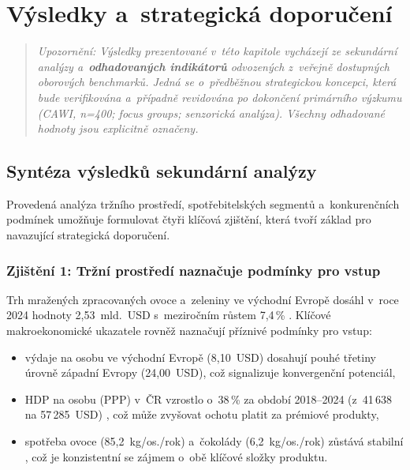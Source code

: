 \chapter{Výsledky a~strategická doporučení}
\label{chap:results}

\begin{quote}
\textit{Upozornění: Výsledky prezentované v~této kapitole vycházejí ze sekundární analýzy a~\textbf{odhadovaných indikátorů} odvozených z~veřejně dostupných oborových benchmarků. Jedná se o~předběžnou strategickou koncepci, která bude verifikována a~případně revidována po dokončení primárního výzkumu (CAWI, n=400; focus groups; senzorická analýza). Všechny odhadované hodnoty jsou explicitně označeny.}
\end{quote}

\section{Syntéza výsledků sekundární analýzy}
\label{sec:res_synthesis}

Provedená analýza tržního prostředí, spotřebitelských segmentů a~konkurenčních podmínek umožňuje formulovat čtyři klíčová zjištění, která tvoří základ pro navazující strategická doporučení.

\subsection{Zjištění 1: Tržní prostředí naznačuje podmínky pro vstup}

Trh mražených zpracovaných ovoce a~zeleniny ve východní Evropě dosáhl v~roce 2024 hodnoty 2,53~mld.~USD s~meziročním růstem 7,4\,\% \parencite{frozenfoodeurope_2025}. Klíčové makroekonomické ukazatele rovněž naznačují příznivé podmínky pro vstup:
\begin{itemize}
  \item výdaje na osobu ve východní Evropě (8,10~USD) dosahují pouhé třetiny úrovně západní Evropy (24,00~USD), což signalizuje konvergenční potenciál,
  \item HDP na osobu (PPP) v~ČR vzrostlo o~38\,\% za období 2018--2024 (z~41\,638 na 57\,285~USD) \parencite{worldbank_gdp_2026}, což může zvyšovat ochotu platit za prémiové produkty,
  \item spotřeba ovoce (85,2~kg/os./rok) a~čokolády (6,2~kg/os./rok) zůstává stabilní \parencite{czso_spotreba_2024}, což je konzistentní se zájmem o~obě klíčové složky produktu.
\end{itemize}

